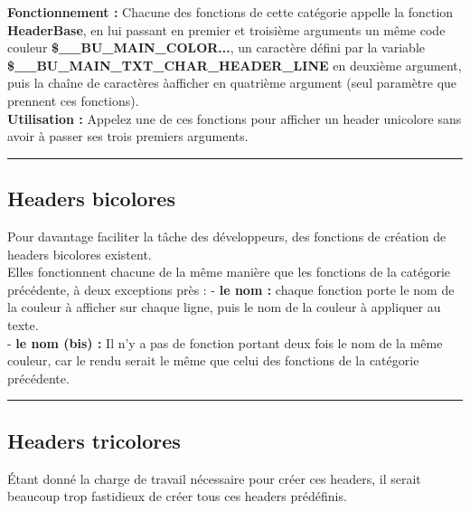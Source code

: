 \documentclass[a4paper,10pt]{article}
\begin{document}
\textbf{Fonctionnement :}\linebreak
Chacune des fonctions de cette catégorie appelle la fonction \textbf{\color{mauve}HeaderBase\color{white}}, en lui passant en premier et troisième arguments un même code couleur \textbf{\color{orange}\$\_\_BU\_MAIN\_COLOR...\color{white}}, un caractère défini par la variable \textbf{\color{orange}\$\_\_BU\_MAIN\_TXT\_CHAR\_HEADER\_LINE\color{white}} en deuxième argument, puis la chaîne de caractères à\linebreak afficher en quatrième argument (seul paramètre que prennent ces fonctions).\\[1\baselineskip]

\textbf{Utilisation :}\linebreak
Appelez une de ces fonctions pour afficher un header unicolore sans avoir à passer ses trois premiers arguments.\\[1\baselineskip]


\color{green}\par\noindent\rule{\textwidth}{0.4pt}\color{white}

\color{green}
\subsection{Headers bicolores}\color{white}
Pour davantage faciliter la tâche des développeurs, des fonctions de création de headers bicolores existent.\\[1\baselineskip]

Elles fonctionnent chacune de la même manière que les fonctions de la catégorie précédente, à deux exceptions près :\linebreak
	- \textbf{le nom :} chaque fonction porte le nom de la couleur à afficher sur chaque ligne, puis le nom de la couleur à appliquer au texte.\\[1\baselineskip]
	- \textbf{le nom (bis) :} Il n'y a pas de fonction portant deux fois le nom de la même couleur, car le rendu serait le même que celui des fonctions de la catégorie précédente.\\[5\baselineskip]

\color{green}\par\noindent\rule{\textwidth}{0.4pt}\color{white}

\color{green}
\subsection{Headers tricolores}\color{white}
Étant donné la charge de travail nécessaire pour créer ces headers, il serait beaucoup trop fastidieux de créer tous ces headers prédéfinis.\\[1\baselineskip]
\end{document}
